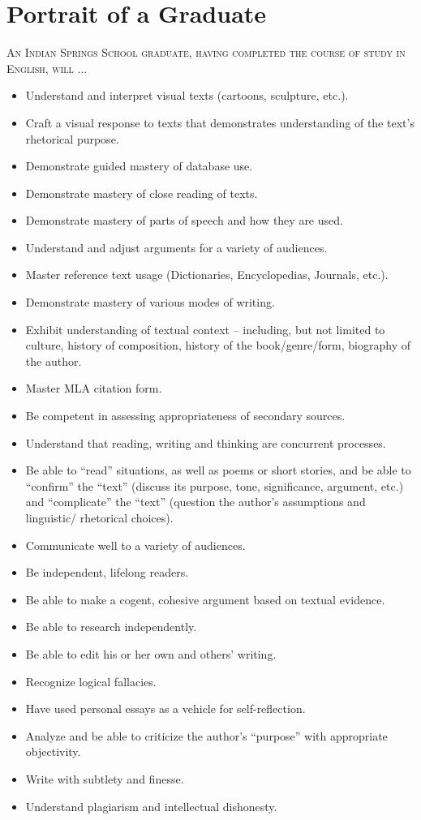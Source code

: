 \section{Portrait of a Graduate}

\textsc{An Indian Springs School graduate, having completed the course of study in English, will} $\ldots$ 
\begin{itemize}\item Understand and interpret visual texts (cartoons, sculpture, etc.).
\item Craft a visual response to texts that demonstrates understanding of the text’s rhetorical purpose.
\item Demonstrate guided mastery of database use.
\item Demonstrate mastery of close reading of texts.
\item Demonstrate mastery of parts of speech and how they are used.
\item Understand and adjust arguments for a variety of audiences.
\item Master reference text usage (Dictionaries, Encyclopedias, Journals, etc.).
\item Demonstrate mastery of various modes of writing.
\item Exhibit understanding of textual context – including, but not limited to culture, history of composition, history of the book/genre/form, biography of the author.
\item Master MLA citation form.
\item Be competent in assessing appropriateness of secondary sources.
\item Understand that reading, writing and thinking are concurrent processes.
\item Be able to ``read'' situations, as well as poems or short stories, and be able to ``confirm'' the ``text'' (discuss its purpose, tone, significance, argument, etc.) and ``complicate'' the ``text'' (question the author’s assumptions and linguistic/ rhetorical choices).
\item Communicate well to a variety of audiences.
\item Be independent, lifelong readers.
\item Be able to make a cogent, cohesive argument based on textual evidence.
\item Be able to research independently.
\item Be able to edit his or her own and others’ writing.
\item Recognize logical fallacies.
\item Have used personal essays as a vehicle for self-reflection.
\item Analyze and be able to criticize the author’s ``purpose'' with appropriate objectivity.
\item Write with subtlety and finesse.
\item Understand plagiarism and intellectual dishonesty.
\end{itemize}